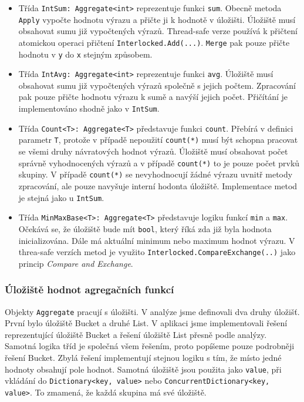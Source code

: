 \begin{itemize}
\item Třída \texttt{IntSum: Aggregate<int>} reprezentuje funkci \texttt{sum}.
Obecně metoda \texttt{Apply} vypočte hodnotu výrazu a přičte ji k hodnotě v úložišti.
Úložiště musí obsahovat sumu již vypočtených výrazů.
Thread-safe verze používá k přičtení atomickou operaci přičtení \texttt{Interlocked.Add(...)}.
\texttt{Merge} pak pouze přičte hodnotu v \texttt{y} do \texttt{x} stejným způsobem.
\item Třída \texttt{IntAvg: Aggregate<int>} reprezentuje funkci \texttt{avg}.
Úložiště musí obsahovat sumu již vypočtených výrazů společně s jejich počtem.
Zpracování pak pouze přičte hodnotu výrazu k sumě a navýší jejich počet.
Přičítání je implementováno shodně jako v \texttt{IntSum}.
\item Třída \texttt{Count<T>: Aggregate<T>} představuje funkci \texttt{count}.
Přebírá v definici parametr \texttt{T}, protože v případě nepoužití \texttt{count(*)} musí být schopna pracovat se všemi druhy návratových hodnot výrazů.
Úložiště musí obsahovat počet správně vyhodnocených výrazů a v případě \texttt{count(*)} to je pouze počet prvků skupiny.
V případě \texttt{count(*)} se nevyhodnocují žádné výrazu uvnitř metody zpracování, ale pouze navyšuje interní hodonta úložiště.
Implementace metod je stejná jako u \texttt{IntSum}.

\item Třída \texttt{MinMaxBase<T>: Aggregate<T>} představuje logiku funkcí \texttt{min} a \texttt{max}.
Očekává se, že úložiště bude mít \texttt{bool}, který říká zda již byla hodnota inicializována.
Dále má aktuální minimum nebo maximum hodnot výrazu. 
V threa-safe verzích metod je využito \texttt{Interlocked.CompareExchange(..)} jako princip \textit{Compare and Exchange}. 
\end{itemize}

\subsubsection{Úložiště hodnot agregačních funkcí}

Objekty \texttt{Aggregate} pracují s úložišti.
V analýze jsme definovali dva druhy úložišť.
První bylo úložiště Bucket a druhé List.
V aplikaci jsme implementovali řešení reprezentující úložiště Bucket a řešení úložiště List přesně podle analýzy.
Samotná logika tříd je společná všem řešením, proto popíšeme pouze podrobněji řešení Bucket.
Zbylá řešení implementují stejnou logiku s tím, že místo jedné hodnoty obsahují pole hodnot.
Samotná úložiště jsou použita jako \texttt{value}, při vkládání do \texttt{Dictionary<key, value>} nebo \texttt{ConcurrentDictionary<key, value>}.
To zmamená, že každá skupina má své úložiště.

